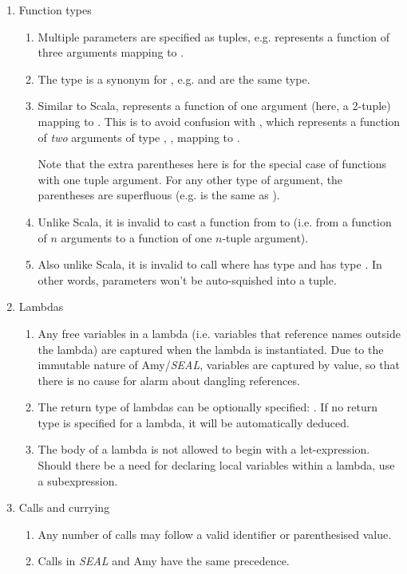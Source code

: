 \begin{enumerate}[label=(\alph*)]
  \item Function types
  \begin{enumerate}[label=(\roman*)]
    \item Multiple parameters are specified as tuples, e.g.  represents a function of three arguments mapping to .
    \item The type \code{()} is a synonym for , e.g. \code{() $\Arr$ ()} and  are the same type.
    \item Similar to Scala,  represents a function of one argument (here, a 2-tuple) mapping to . This is to avoid confusion with , which represents a function of \textit{two} arguments of type , , mapping to .

    Note that the extra parentheses here is for the special case of functions with one tuple argument. For any other type of argument, the parentheses are superfluous (e.g.  is the same as ).
    \item Unlike Scala, it is invalid to cast a function from  to  (i.e. from a function of $n$ arguments to a function of one $n$-tuple argument).
    \item Also unlike Scala, it is invalid to call  where  has type  and  has type . In other words, parameters won't be auto-squished into a tuple.
  \end{enumerate}
  \item Lambdas
  \begin{enumerate}[label=(\roman*)]
    \item Any free variables in a lambda (i.e. variables that reference names outside the lambda) are captured when the lambda is instantiated. Due to the immutable nature of Amy/\textit{SEAL}, variables are captured by value, so that there is no cause for alarm about dangling references.
    \item The return type of lambdas can be optionally specified: . If no return type is specified for a lambda, it will be automatically deduced.
    \item The body of a lambda is not allowed to begin with a let-expression. Should there be a need for declaring local variables within a lambda, use a subexpression.
  \end{enumerate}
  \item Calls and currying
  \begin{enumerate}[label=(\roman*)]
    \item Any number of calls may follow a valid identifier or parenthesised value.
    \item Calls in \textit{SEAL} and Amy have the same precedence.
  \end{enumerate}
\end{enumerate}
